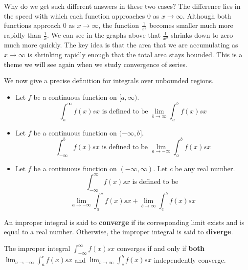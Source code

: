 \documentclass{ximera}
\begin{document}
Why do we get such different answers in these two cases?  The difference lies in the speed with which each function approaches $0$ as $x \to \infty$. Although both functions approach $0$ as $x \to \infty$, the function $\frac{1}{x^2}$ becomes smaller much more rapidly than $\frac{1}{x}$. 
We can see in the graphs above that $\frac{1}{x^2}$ shrinks down to zero much more quickly. The key idea is that the area that we are accumulating as $x\to \infty$ is shrinking rapidly enough that the total area stays bounded. This is a theme we will see again when we study convergence of series. 

We now give a precise definition for integrals over unbounded regions.

\begin{definition}\hfil
\begin{itemize}
\item Let $f$ be a continuous function on $[a,\infty)$.
  \[
  \int_a^\infty f(x) sx \text{ is defined to be } \lim_{b\to\infty}\int_a^b f(x) sx
  \]
\item Let $f$ be a continuous function on $(-\infty,b]$.
  \[
  \int_{-\infty}^b f(x) sx \text{ is defined to be } \lim_{a\to-\infty}\int_a^b f(x) sx
  \]
\item Let $f$ be a continuous function on $(-\infty,\infty)$. Let $c$
  be any real number.
  \[
  \int_{-\infty}^\infty f(x) sx \text{ is defined to be }
  \]
  \[
  \lim_{a\to-\infty}\int_a^c f(x) sx + \lim_{b\to\infty}\int_c^b
  f(x) sx
  \]
\end{itemize}
An improper integral is said to \textbf{converge} if its corresponding
limit exists and is equal to a real number. Otherwise, the improper
integral is said to \textbf{diverge}. 
\end{definition}

\begin{warning}
  The improper integral $  \int_{-\infty}^\infty f(x) sx$ converges if and only if \textbf{both}  $ \lim_{a\to-\infty}\int_a^c f(x) sx$
and $  \lim_{b\to\infty}\int_c^b f(x) sx$
independently converge.
\end{warning}
\end{document}
